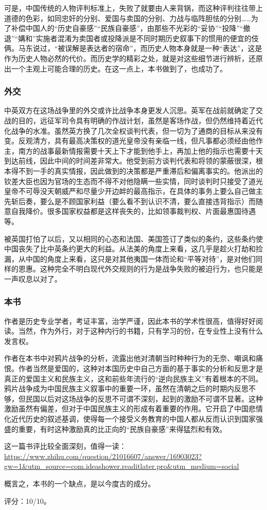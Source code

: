 可是，中国传统的人物评判标准上，失败了就要由人来背锅，而这种评判往往带上道德的色彩，如同忠奸的分别、爱国与卖国的分别、力战与临阵胆怯的分别……为了补偿中国人的“历史自豪感”“民族自豪感”，由那些不光彩的“妥协”“投降”“撤退”“媾和”实施者混淆为卖国者或投降派是不同时期历史叙事下的惯用的便宜的伎俩。马东说过，“被误解是表达者的宿命”，而历史人物本身就是一种“表达”，这是作为历史人物必然的代价。而历史学的精彩之处，就是对这些细节进行辨析，还原出一个主观上可能合理的历史。在这一点上，本书做到了，也成功了。

\subsubsection{外交}
中英双方在这场战争里的外交或许比战争本身更发人沉思。英军在战前就确定了交战的目的，远征军司令具有明确的作战计划，虽然是客场作战，但仍然维持着近代化战争的水准。虽然英方换了几次全权谈判代表，但一切为了通商的目标从来没有变。反观清方，具有最高决策权的道光皇帝没有亲临一线，但凡事都必须经由他作主，南方的战事最新情报需要十天上下才能到他手上，再加上他的指示也需要十天到达前线，因此中间的时间差非常大。他受到前方谈判代表和将领的蒙蔽很深，根本得不到一手的真实情报，因此做到的决策都是严重滞后和偏离事实的。他派出的钦差大臣也因为官场的生态而不得不对他隐瞒一些实情，同时谈判时只接受了道光皇帝不可辱没天朝威严和尽量少开边衅的最高指示，在具体的事务上要么自己做主先斩后奏，要么是不顾国家利益（要么看不到认识不清，要么直接违背指示）而随意自我降价。很多国家权益都是这样丧失的，比如领事裁判权、片面最惠国待遇等。

被英国打怕了以后，又以相同的心态和法国、美国签订了类似的条约，这些条约使中国丧失了比中英条约更大的利益。从法美的角度上来看，这几乎是趁火打劫和捡漏，从中国的角度上来看，这只是对其他夷国一体而论和“平等对待”，是对他们同样的恩惠。这种完全不明白现代外交规则的行为是战争失败的被迫行为，也只能是一声叹息以对了。

\subsubsection{本书}
作者是历史专业学者，考证丰富，治学严谨，因此本书的学术性很高，值得好好阅读。当然，作为外行，对于这种内行的书籍，只有学习的份，在专业性上没有什么发言权。

作者在本书中对鸦片战争的分析，流露出他对清朝当时种种行为的无奈、嘲讽和痛恨。作者当然是爱国的，这种对本国历史中自己方面的基于事实的分析和反思才是真正的爱国主义和民族主义，这和前些年流行的“逆向民族主义”有着根本的不同。鸦片战争成为中国民族主义叙事中的重要一环，虽然在清朝之后的时期内反思不够，但民国以后对这场战争的反思不可谓不深刻，起到的激励不可谓不显著。这种激励虽然有偏差，但对于中国民族主义的形成有着重要的作用。它开启了中国悲情化近代历史的叙述基调，使得每一个接受义务教育的中国人都从反而认识到国家强盛的重要，有时这种激励真的比正向的“民族自豪感”来得猛烈和有效。

这一篇书评比较全面深刻，值得一读：\url{https://www.zhihu.com/question/21016607/answer/16903023?gw=1&utm_source=com.ideashower.readitlater.pro&utm_medium=social}

概言之，本书的一个缺点，是以今度古的成分。

评分：10/10。
